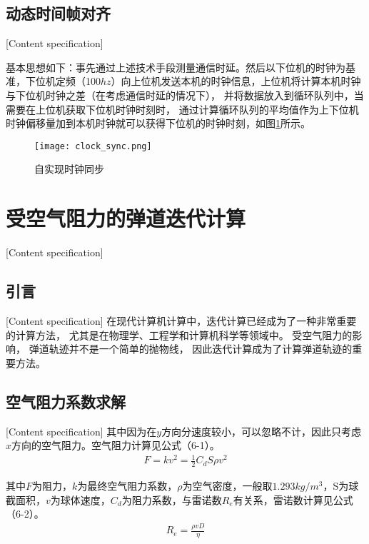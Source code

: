 \subsection{动态时间帧对齐}[Content specification]

基本思想如下：事先通过上述技术手段测量通信时延。然后以下位机的时钟为基准，下位机定频（100$hz$）向上位机发送本机的时钟信息，上位机将计算本机时钟与下位机时钟之差（在考虑通信时延的情况下），
并将数据放入到循环队列中，当需要在上位机获取下位机时钟时刻时，
通过计算循环队列的平均值作为上下位机时钟偏移量加到本机时钟就可以获得下位机的时钟时刻，如图\ref{clock_sync}所示。

\begin{figure}[H]
    \centering
    \texttt{[image: clock\_sync.png]} 
    \caption{自实现时钟同步} 
    \label{clock_sync}
\end{figure}




\section{受空气阻力的弹道迭代计算}[Content specification]


\subsection{引言}[Content specification]
在现代计算机计算中，迭代计算已经成为了一种非常重要的计算方法，
尤其是在物理学、工程学和计算机科学等领域中。
受空气阻力的影响，
弹道轨迹并不是一个简单的抛物线，
因此迭代计算成为了计算弹道轨迹的重要方法。


\subsection{空气阻力系数求解}[Content specification]
其中因为在$y$⽅向分速度较⼩，可以忽略不计，因此只考虑$x$⽅向的空⽓阻⼒。空气阻力计算见公式（6-1）。
\begin{gather}
    F = kv^2 =  \frac{1}{2} C_dS \rho  v^2
\end{gather}

\par

其中$F$为阻力，$k$为最终空气阻力系数，$\rho$为空气密度，一般取$1.293kg/m^3$，S为球截面积，$v$为球体速度，$C_d$为阻力系数，与雷诺数$R_e$有关系，雷诺数计算见公式（6-2）。
\begin{gather}
    R_e = \frac{\rho v D}{\eta}
\end{gather}

